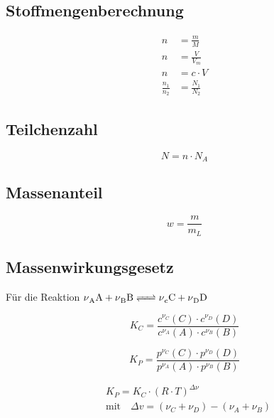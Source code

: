 
\subsection{Stoffmengenberechnung}

\begin{align}\label{eq:chemie:stoffmengenberechnung}
n &= \frac{m}{M}\\
n &= \frac{V}{V_m}\\
n &= c\cdot V\\
\frac{n_1}{n_2} &= \frac{N_1}{N_2}
\end{align}

\subsection{Teilchenzahl}
\begin{equation}\label{eq:chemie:teilchenzahl}
N = n \cdot N_A
\end{equation}

\subsection{Massenanteil}
\begin{equation}
w = \frac{m}{m_L}
\end{equation}

\subsection{Massenwirkungsgesetz}
Für die Reaktion $\ce{\nu_A A + \nu_B B <=> \nu_c C + \nu_D D}$

\begin{equation}
K_C =\frac{c^{\nu_C}(C)\cdot c^{\nu_D}(D)}{c^{\nu_A}(A)\cdot c^{\nu_B}(B)}
\end{equation}

\begin{equation}
K_P =\frac{p^{\nu_C}(C)\cdot p^{\nu_D}(D)}{p^{\nu_A}(A)\cdot p^{\nu_B}(B)}
\end{equation}

\begin{equation}
\begin{split}
&K_P = K_C\cdot \left(R \cdot T\right)^{\Delta \nu} \\
&\text{mit}\quad \Delta v = (\nu_C + \nu_D) - (\nu_A + \nu_B)
\end{split}
\end{equation}

